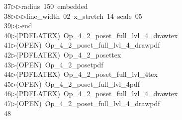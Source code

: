 \begin{tabbing}
37\>$\triangleright$\>$\triangleright$\>radius\ 150\ embedded\ \\[0pt]
38\>$\triangleright$\>$\triangleright$\>$\triangleright$\>line\_width\ 02\ x\_stretch\ 14\ scale\ 05\ \\[0pt]
39\>$\triangleright$\>$\triangleright$\>end\\[0pt]
40\>$\triangleright$\>(PDFLATEX)\ Op\_4\_2\_poset\_full\_lvl\_4\_drawtex\\[0pt]
41\>$\triangleright$\>(OPEN)\ Op\_4\_2\_poset\_full\_lvl\_4\_drawpdf\\[0pt]
42\>$\triangleright$\>(PDFLATEX)\ Op\_4\_2\_posettex\\[0pt]
43\>$\triangleright$\>(OPEN)\ Op\_4\_2\_posetpdf\\[0pt]
44\>$\triangleright$\>(PDFLATEX)\ Op\_4\_2\_poset\_full\_lvl\_4tex\\[0pt]
45\>$\triangleright$\>(OPEN)\ Op\_4\_2\_poset\_full\_lvl\_4pdf\\[0pt]
46\>$\triangleright$\>(PDFLATEX)\ Op\_4\_2\_poset\_full\_lvl\_4\_drawtex\\[0pt]
47\>$\triangleright$\>(OPEN)\ Op\_4\_2\_poset\_full\_lvl\_4\_drawpdf\\[0pt]
48\>\end{tabbing}

